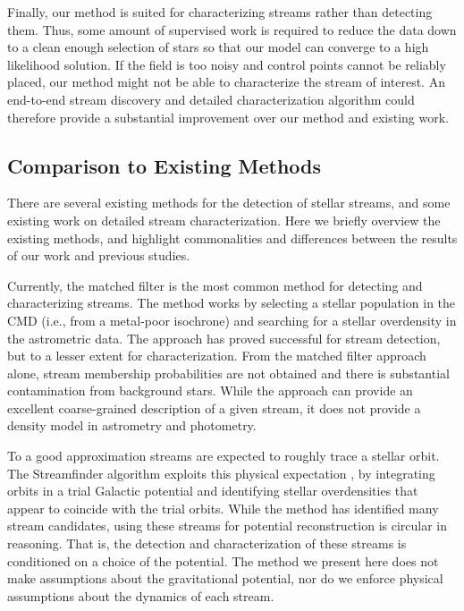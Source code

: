 \documentclass[twocolumn]{aastex631}
\begin{document}
        Finally, our method is suited for characterizing streams rather than
        detecting them. Thus, some amount of supervised work is required to
        reduce the data down to a clean enough selection of stars so that our
        model can converge to a high likelihood solution. If the field is too
        noisy and control points cannot be reliably placed, our method might not
        be able to characterize the stream of interest. An end-to-end stream
        discovery and detailed characterization algorithm could therefore
        provide a substantial improvement over our method and existing work. 


    \subsection{Comparison to Existing Methods} \label{sec:comparison}

        There are several existing methods for the detection of stellar streams,
        and some existing work on detailed stream characterization. Here we
        briefly overview the existing methods, and highlight commonalities and
        differences between the results of our work and previous studies. 

        Currently, the matched filter is the most common method for detecting
        and characterizing streams. The method works by selecting a stellar
        population in the CMD (i.e., from a metal-poor isochrone) and searching
        for a stellar overdensity in the astrometric data. The approach has
        proved successful for stream detection, but to a lesser extent for
        characterization. From the matched filter approach alone, stream
        membership probabilities are not obtained and there is substantial
        contamination from background stars. While the approach can provide an
        excellent coarse-grained description of a given stream, it does not
        provide a density model in astrometry and photometry. 

        To a good approximation streams are expected to roughly trace a stellar
        orbit. The Streamfinder algorithm exploits this physical expectation
        \citep{STREAMFINDER}, by integrating orbits in a trial Galactic
        potential and identifying stellar overdensities that appear to coincide
        with the trial orbits. While the method has identified many stream
        candidates, using these streams for potential reconstruction is circular
        in reasoning. That is, the detection and characterization of these
        streams is conditioned on a choice of the potential. The method we
        present here does not make assumptions about the gravitational
        potential, nor do we enforce physical assumptions about the dynamics of
        each stream. 
\end{document}
